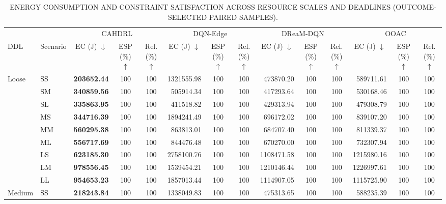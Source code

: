 \begin{table}[!t]
\centering
\caption{ENERGY CONSUMPTION AND CONSTRAINT SATISFACTION ACROSS RESOURCE SCALES AND DEADLINES (OUTCOME-SELECTED PAIRED SAMPLES).}
\label{tab:constraint_results_preview}
\scriptsize
\setlength{\tabcolsep}{2.3pt}
\renewcommand{\arraystretch}{1.00}
\begin{tabular}{@{}ll*{4}{rcc}@{}}
\toprule
& & \multicolumn{3}{c}{CAHDRL} & \multicolumn{3}{c}{DQN-Edge} & \multicolumn{3}{c}{DReaM-DQN} & \multicolumn{3}{c}{OOAC} \\
\cmidrule(lr){3-5}\cmidrule(lr){6-8}\cmidrule(lr){9-11}\cmidrule(l){12-14}
DDL & Scenario
& \multicolumn{1}{c}{EC (J) $\downarrow$} & ESP (\%) $\uparrow$ & Rel. (\%) $\uparrow$
& \multicolumn{1}{c}{EC (J) $\downarrow$} & ESP (\%) $\uparrow$ & Rel. (\%) $\uparrow$
& \multicolumn{1}{c}{EC (J) $\downarrow$} & ESP (\%) $\uparrow$ & Rel. (\%) $\uparrow$
& \multicolumn{1}{c}{EC (J) $\downarrow$} & ESP (\%) $\uparrow$ & Rel. (\%) $\uparrow$ \\
\midrule
Loose & SS & \textbf{203652.44} & 100 & 100 & 1321555.98 & 100 & 100 & 473870.20 & 100 & 100 & 589711.61 & 100 & 100 \\
 & SM & \textbf{340859.56} & 100 & 100 & 505914.34 & 100 & 100 & 417293.64 & 100 & 100 & 530168.46 & 100 & 100 \\
 & SL & \textbf{335863.95} & 100 & 100 & 411518.82 & 100 & 100 & 429313.94 & 100 & 100 & 479308.79 & 100 & 100 \\
 & MS & \textbf{344716.39} & 100 & 100 & 1894241.49 & 100 & 100 & 696172.02 & 100 & 100 & 839107.20 & 100 & 100 \\
 & MM & \textbf{560295.38} & 100 & 100 & 863813.01 & 100 & 100 & 684707.40 & 100 & 100 & 811339.37 & 100 & 100 \\
 & ML & \textbf{556717.69} & 100 & 100 & 844476.48 & 100 & 100 & 670270.00 & 100 & 100 & 732307.94 & 100 & 100 \\
 & LS & \textbf{623185.30} & 100 & 100 & 2758100.76 & 100 & 100 & 1108471.58 & 100 & 100 & 1215980.16 & 100 & 100 \\
 & LM & \textbf{978556.45} & 100 & 100 & 1539454.21 & 100 & 100 & 1210146.44 & 100 & 100 & 1226997.61 & 100 & 100 \\
 & LL & \textbf{954653.23} & 100 & 100 & 1857013.44 & 100 & 100 & 1114907.05 & 100 & 100 & 1115725.90 & 100 & 100 \\
\midrule
Medium & SS & \textbf{218243.84} & 100 & 100 & 1338049.83 & 100 & 100 & 475313.65 & 100 & 100 & 588235.39 & 100 & 100 \\

\end{tabular}
\end{table}
